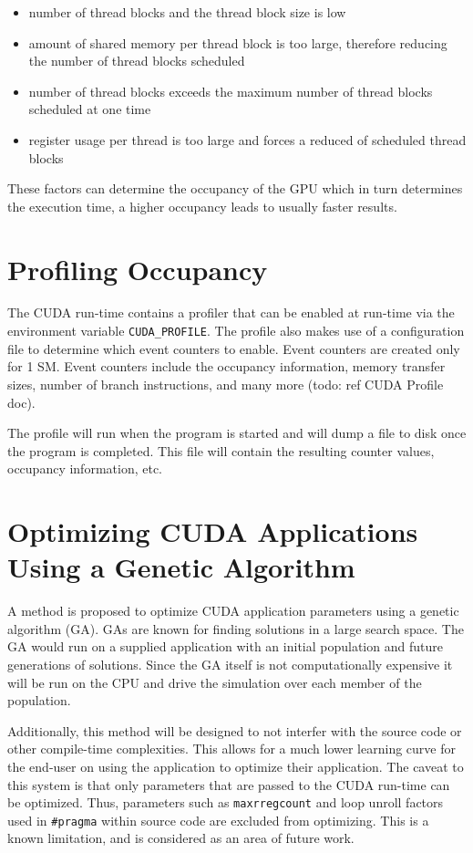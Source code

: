 \begin{itemize}
\item{number of thread blocks and the thread block size is low}
\item{amount of shared memory per thread block is too large, therefore reducing the number of thread blocks scheduled}
\item{number of thread blocks exceeds the maximum number of thread blocks scheduled at one time}
\item{register usage per thread is too large and forces a reduced of scheduled thread blocks}
\end{itemize}

These factors can determine the occupancy of the GPU which in turn determines the execution time, a higher occupancy leads to usually faster results.

\section{Profiling Occupancy}
The CUDA run-time contains a profiler that can be enabled at run-time via the environment variable \texttt{CUDA\_PROFILE}. The profile also makes use of a configuration file to determine which event counters to enable. Event counters are created only for 1 SM. Event counters include the occupancy information, memory transfer sizes, number of branch instructions, and many more (todo: ref CUDA Profile doc).

The profile will run when the program is started and will dump a file to disk once the program is completed. This file will contain the resulting counter values, occupancy information, etc.

\section{Optimizing CUDA Applications Using a Genetic Algorithm}
A method is proposed to optimize CUDA application parameters using a genetic algorithm (GA). GAs are known for finding solutions in a large search space. The GA would run on a supplied application with an initial population and future generations of solutions. Since the GA itself is not computationally expensive it will be run on the CPU and drive the simulation over each member of the population.

Additionally, this method will be designed to not interfer with the source code or other compile-time complexities. This allows for a much lower learning curve for the end-user on using the application to optimize their application. The caveat to this system is that only parameters that are passed to the CUDA run-time can be optimized. Thus, parameters such as \texttt{\-maxrregcount} and loop unroll factors used in \texttt{\#pragma} within source code are excluded from optimizing. This is a known limitation, and is considered as an area of future work.

